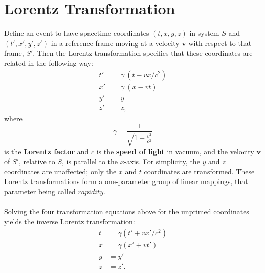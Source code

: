\section{Lorentz Transformation}
Define an event to have spacetime coordinates $(t, x, y, z)$ in system $S$ and $( t', x', y', z')$ in a reference frame moving at a velocity $\mathbf{v}$ with respect to that frame, $S'$. Then the Lorentz transformation specifies that these coordinates are related in the following way:
\[
\begin{aligned}
t' & = \gamma \ (t - vx/c^2) \\
x' & = \gamma \ (x - v t) \\
y' & = y \\
z' & = z ,
\end{aligned}
\]
where
\[
\gamma = \frac{1}{\sqrt{1 - \frac{v^2}{c^2}}}
\]
is the \textbf{Lorentz factor} and $c$ is the \textbf{speed of light} in vacuum, and the velocity $\mathbf{v}$ of $S'$, relative to $S$, is parallel to the $x$-axis. For simplicity, the $y$ and $z$ coordinates are unaffected; only the $x$ and $t$ coordinates are transformed. These Lorentz transformations form a one-parameter group of linear mappings, that parameter being called $rapidity$.
\\\\
Solving the four transformation equations above for the unprimed coordinates yields the inverse Lorentz transformation:
\[
\begin{aligned}
t & = \gamma (t'+vx'/c^{2}) \\
x & = \gamma (x'+vt') \\
y & = y' \\
z & = z'.
\end{aligned}
\]